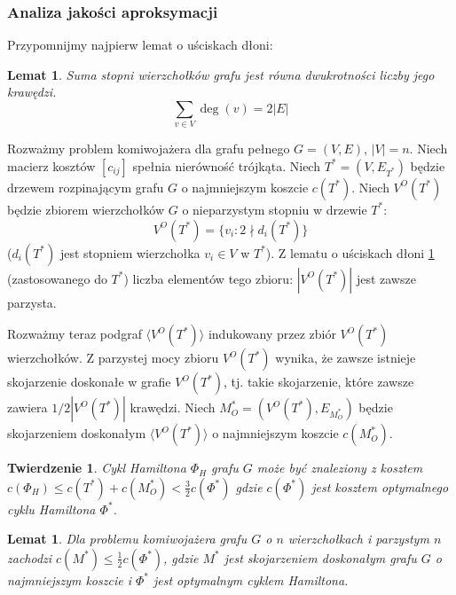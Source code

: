\documentclass{article}
\theoremstyle{definition}
\theoremstyle{plain}
\newtheorem{theorem}[definition]{Twierdzenie}
\newtheorem{lemma}[definition]{Lemat}
\theoremstyle{remark}
\begin{document}
\subsubsection{Analiza jakości aproksymacji}

Przypomnijmy najpierw lemat o uściskach dłoni:
\begin{lemma} \label{lamma:shakingHands}
    Suma stopni wierzchołków grafu jest równa dwukrotności liczby jego krawędzi. 
    \begin{equation*}
        \displaystyle\sum_{v\in V}\deg(v) = 2|E|
    \end{equation*}
\end{lemma}

Rozważmy problem komiwojażera dla grafu pełnego $G = (V, E)$, $|V| = n$. Niech macierz kosztów $[c_{ij}]$ spełnia nierówność trójkąta. 
Niech $T^* = (V, E_{T^*})$ będzie drzewem rozpinającym grafu $G$ o najmniejszym koszcie  $c(T^*)$. Niech $V^O(T^*)$ będzie zbiorem wierzchołków $G$ o nieparzystym stopniu w drzewie $T^*$:
\[
  V^O(T^*) = \{v_i: 2 \nmid d_i(T^*)\}
\]
($d_i(T^*)$ jest stopniem wierzchołka $v_i\in V$ w $T^*$). Z lematu o uściskach dłoni \ref{lamma:shakingHands} (zastosowanego do $T^*$) liczba elementów tego zbioru: $|V^O(T^*)|
$ jest zawsze parzysta. 

Rozważmy teraz podgraf $\langle V^O(T^*)\rangle$ indukowany przez zbiór $V^O(T^*)$ wierzchołków. Z parzystej mocy zbioru $V^O(T^*)$ wynika, że zawsze istnieje skojarzenie doskonałe w grafie $V^O(T^*)$, tj. takie skojarzenie, które zawsze zawiera $1/2|V^O(T^*)|$ krawędzi. Niech $M_O^* = \left(V^O(T^*), E_{M_O^*}\right)$ będzie skojarzeniem doskonałym $\langle V^O(T^*)\rangle$ o najmniejszym koszcie $c(M_O^*)$. 

\begin{theorem} \label{theorem:christofides}
    Cykl Hamiltona $\Phi_H$ grafu $G$ może być znaleziony z kosztem $c(\Phi_H) \leq c(T^*) + c(M_O^*) < \frac{3}{2}c(\Phi^*)$ gdzie $c(\Phi^*)$ jest kosztem optymalnego cyklu Hamiltona $\Phi^*$. 
\end{theorem}

\begin{lemma} \label{lemma:christofides}
    Dla problemu komiwojażera grafu $G$ o $n$ wierzchołkach i parzystym $n$ zachodzi $c(M^*) \leq \frac{1}{2}c(\Phi^*)$, gdzie $M^*$ jest skojarzeniem doskonałym grafu $G$ o najmniejszym koszcie i $\Phi^*$ jest optymalnym cyklem Hamiltona. 
\end{lemma}
\end{document}
